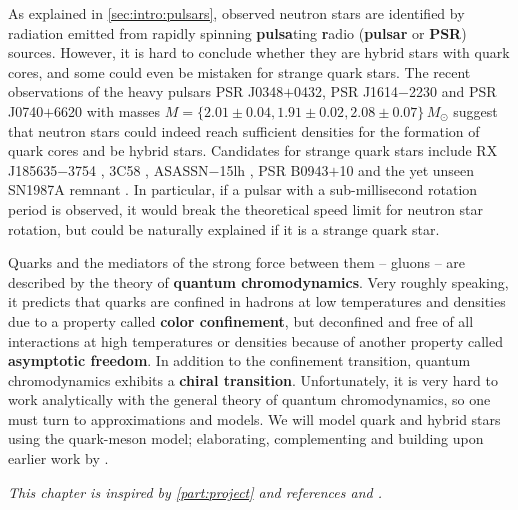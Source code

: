 As explained in \cref{sec:intro:pulsars},
observed neutron stars are identified by radiation emitted from rapidly spinning \textbf{pulsa}ting \textbf{r}adio (\textbf{pulsar} or \textbf{PSR}) sources.
However, it is hard to conclude whether they are hybrid stars with quark cores, and some could even be mistaken for strange quark stars.
The recent observations \cite{ref:antoniadis,ref:arzoumanian,ref:fonseca}
of the heavy pulsars PSR J0348$+$0432, PSR J1614$-$2230 and PSR J0740$+$6620
with masses $M = \{2.01 \pm 0.04, 1.91 \pm 0.02, 2.08 \pm 0.07\} \, M_\odot$ 
suggest that neutron stars could indeed reach sufficient densities for the formation of quark cores and be hybrid stars.
Candidates for strange quark stars include
RX J185635$-$3754 \cite{ref:RXJ1856}, 
3C58 \cite{ref:3c58}, 
ASASSN$-$15lh \cite{ref:ASASSN}, 
PSR B0943$+$10 \cite{ref:PSRB0943}
and the yet unseen SN1987A remnant \cite{ref:SN1987A_1,ref:SN1987A_2}.
In particular, if a pulsar with a sub-millisecond rotation period is observed,
it would break the theoretical speed limit for neutron star rotation,
but could be naturally explained if it is a strange quark star.
\cite{ref:glendenning} %

Quarks and the mediators of the strong force between them -- gluons -- are described by the theory of \textbf{quantum chromodynamics}.
Very roughly speaking, it predicts that quarks are confined in hadrons at low temperatures and densities due to a property called \textbf{color confinement},
but deconfined and free of all interactions at high temperatures or densities because of another property called \textbf{asymptotic freedom}.
In addition to the confinement transition, quantum chromodynamics exhibits a \textbf{chiral transition}.
Unfortunately, it is very hard to work analytically with the general theory of quantum chromodynamics,
so one must turn to approximations and models.
We will model quark and hybrid stars using the quark-meson model;
elaborating, complementing and building upon earlier work by \cite{ref:master_berge}.

\textit{This chapter is inspired by \cref{part:project} and references \cite{ref:glendenning} and \cite{ref:schwartz}.}

\section{\texorpdfstring{}{The Tolman-Oppenheimer-Volkoff equation and stellar stability}}
\label{sec:master_intro:tov}

